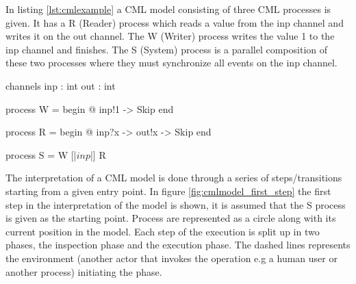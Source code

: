 \documentclass[a4paper, 10pt]{include/compassreport}   %
\begin{document}
In listing \ref{lst:cmlexample} a CML model consisting of three CML
processes is given. It has a R (Reader) process which reads a value from
the inp channel and writes it on the out channel. The W (Writer)
process writes the value 1 to the inp channel and finishes. The
S (System) process is a parallel composition of these two processes where
they must synchronize all events on the inp channel.

\begin{cml}[caption=A process S composed of a parallel composition of a reader and writer process,tabsize=2, label={lst:cmlexample}]
channels
inp : int
out : int

process W = 
begin
 @ inp!1 -> Skip 
end

process R = 
begin
 @ inp?x -> out!x -> Skip 
end

process S = W [|{$inp$}|] R
\end{cml}

The interpretation of a CML model is done through a series of
steps/transitions starting from a given entry point. In figure
\ref{fig:cmlmodel_first_step} the first step in the interpretation of
the model is shown, it is assumed that the S process is given as the
starting point. Process are represented as a circle along with its
current position in the model. Each step of the execution is split up
in two phases, the inspection phase and the execution phase. The
dashed lines represents the environment (another actor that invokes
the operation e.g a human user or another process) initiating the phase.

 \begin{minipage}{1\linewidth} 
  \centering %
\label{fig:cmlmodel_first_step}
 \end{minipage} 
\end{document}
